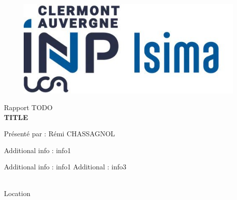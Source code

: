 
\begin{titlepage}
  \rmfamily{}

  \begin{figure}
    \centering
    \includegraphics[width=0.7\linewidth]{logos/isima.jpeg}
    \label{fig:ISIMA}
  \end{figure}

  \begin{center}
    \begin{Large}
      Rapport TODO\\
      \vspace{0.3cm}
      \textbf{TITLE}
    \end{Large}

    \vspace{3cm}
    \begin{large}
      Présenté par : Rémi CHASSAGNOL\\
    \end{large}
  \end{center}

  \vspace{4cm}
  Additional info : info1\par
  Additional info : info1 \hfill Additional : info3\\\\

  \begin{center}
    \begin{small}
      Location\par
    \end{small}
  \end{center}
\end{titlepage}
